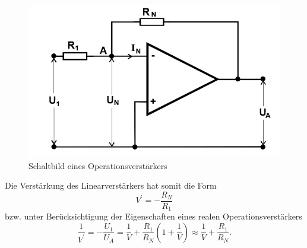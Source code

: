 \begin{figure}
	\centering
	\includegraphics[width=\textwidth]{img/linear.png}
	\caption{Schaltbild eines Operationsverstärkers}
	\label{abb:linear}
\end{figure}

Die Verstärkung des Linearverstärkers hat somit die Form
\begin{equation}
V^\prime = - \frac{R_N}{R_1}
\end{equation}
bzw. unter Berücksichtigung der Eigenschaften eines realen Operationsverstärkers
\begin{equation}
\frac{1}{V^\prime} = - \frac{U_1}{U_A} = \frac{1}{V} + \frac{R_1}{R_N} \left( 1 + \frac{1}{V} \right) \approx \frac{1}{V} + \frac{R_1}{R_N}.
\label{effVerstaerkung}
\end{equation}


